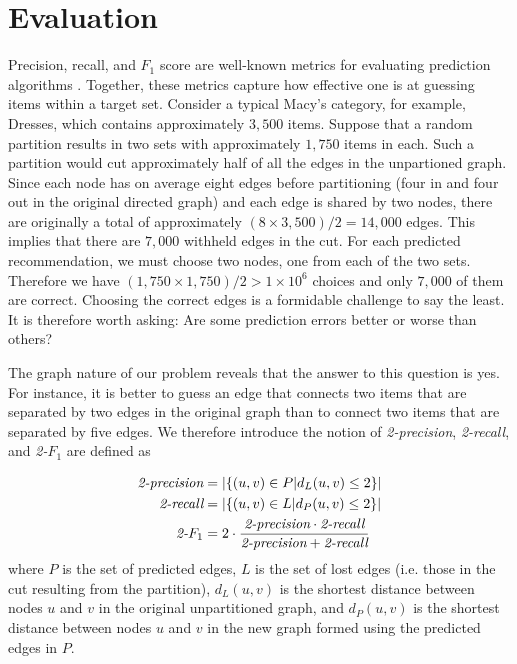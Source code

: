\documentclass[11pt]{article}
\begin{document}
\section*{Evaluation}
Precision, recall, and $F_1$ score are well-known metrics for evaluating
prediction algorithms \cite{Powers2011}. Together, these metrics capture how
effective one is at guessing items within a target set. Consider a typical
Macy's category, for example, Dresses, which contains approximately $3,500$
items. Suppose that a random partition results in two sets with approximately
$1,750$ items in each. Such a partition would cut approximately half of all the
edges in the unpartioned graph. Since each node has on average eight edges
before partitioning (four in and four out in the original directed graph) and
each edge is shared by two nodes, there are originally a total of approximately
$\left(8 \times 3,500\right) / 2 = 14,000$ edges. This implies that there are
$7,000$ withheld edges in the cut. For each predicted recommendation, we must
choose two nodes, one from each of the two sets. Therefore we have $\left(1,750
\times 1,750\right)/2 > 1 \times 10^6$ choices and only $7,000$ of them are
correct. Choosing the correct edges is a formidable challenge to say the least.
It is therefore worth asking: Are some prediction errors better or worse than
others?

The graph nature of our problem reveals that the answer to this question is yes.
For instance, it is better to guess an edge that connects two items that are
separated by two edges in the original graph than to connect two items that are
separated by five edges. We therefore introduce the notion of {\em 2-precision},
{\em 2-recall}, and {\em 2-}$F_1$ are defined as

\begin{align}
\text{\em 2-precision} &= \left|\left\{(u,v) \in P | d_L(u,v) \leq 2
\right\}\right|
\\\text{\em 2-recall} &= \left|\left\{(u,v) \in L | d_P(u,v) \leq 2
\right\}\right|
\\\text{\em 2-}F_1 &= 2\cdot \frac{\text{\em 2-precision} \cdot \text{\em
2-recall}}{\text{\em 2-precision} + \text{\em 2-recall}}
\end{align}
where $P$ is the set of predicted edges, $L$ is the set of lost edges (i.e.
those in the cut resulting from the partition), $d_L(u,v)$ is the shortest
distance between nodes $u$ and $v$ in the original unpartitioned graph, and
$d_P(u,v)$ is the shortest distance between nodes $u$ and $v$ in the new graph
formed using the predicted edges in $P$.
\end{document}
